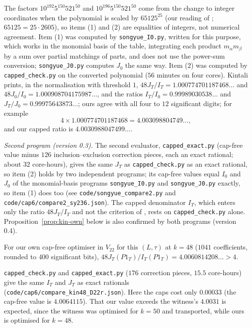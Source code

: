 The factors $10^{192}5^{150}521^{50}$ and $10^{196}5^{150}521^{50}$ come from the
change to integer coordinates when the polynomial is scaled by $65125^{25}$
(our reading of \cite[Eq.~(71)]{SY26}; $65125=25\cdot2605$), so items (1) and
(2) are equalities of integers, not numerical agreement. Item (1) was computed
by \texttt{songyue\_I0.py}, written for this purpose, which works in the monomial basis of
the table, integrating each product $m_\alpha m_\beta$ by a sum over partial
matchings of parts, and does not use the power-sum conversion;
\texttt{songyue\_J0.py} computes $J_0$ the same way. Item (2) was
computed by \texttt{capped\_check.py} on the converted polynomial ($56$ minutes
on four cores). Kintali \cite{Kin26} prints, in the normalisation with
threshold $1$, $48J_T/I_T=1.000774701187468\ldots$ and
$48J_0/I_0=1.000908704175987\ldots$, and the ratios $I_T/I_0=0.99989030538\ldots$
and $J_T/J_0=0.99975643873\ldots$; ours agree with all four to $12$
significant digits; for example
\[4\times1.000774701187468=4.003098804749\ldots,\]
and our capped ratio is $4.0030988047499\ldots$.

\emph{Second program (version 0.3).} The second evaluator,
\texttt{capped\_exact.py} (cap-free value minus $126$ inclusion--exclusion
correction pieces, each an exact rational; about $32$ core-hours), gives the
same $J_T$ as \texttt{capped\_check.py} as an exact rational, so item (2)
holds by two independent programs; its cap-free values equal $I_0$ and $J_0$
of the monomial-basis programs \texttt{songyue\_I0.py} and
\texttt{songyue\_J0.py} exactly, so item (1) does too (see
\texttt{code/}\allowbreak\texttt{songyue\_compare2.py} and
\texttt{code/}\allowbreak\texttt{cap6/}\allowbreak\texttt{compare2\_sy236.json}).
The capped denominator $I_T$, which enters only the ratio $48J_T/I_T$ and not
the criterion of \cite{SY26}, rests on \texttt{capped\_check.py} alone.
Proposition~\ref{prop:kin-own} below is also confirmed by both programs
(version 0.4).

\begin{proposition}\label{prop:kin-own}
For our own cap-free optimiser in $V_{22}$ for this $(L,\tau)$ at $k=48$
($1041$ coefficients, rounded to $400$ significant bits),
$48J_T(P1_T)/I_T(P1_T)=4.0060814208\ldots>4$.
\end{proposition}

\texttt{capped\_check.py} and \texttt{capped\_exact.py} ($176$ correction
pieces, $15.5$ core-hours) give the same $I_T$ and $J_T$ as exact rationals
(\texttt{code/}\allowbreak\texttt{cap6/}\allowbreak\texttt{compare\_kin48\_D22r.json}).
Here the caps cost only $0.00033$ (the cap-free value is $4.0064115$). That our
value exceeds the witness's $4.0031$ is expected, since the witness was
optimised for $k=50$ and transported, while ours is optimised for $k=48$.

